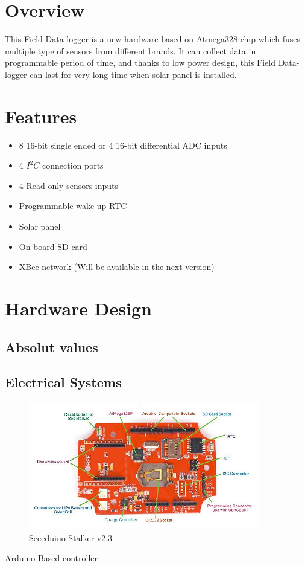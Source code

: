 \newpage
\tableofcontents \newpage
\listoffigures  \newpage

\newpage

\section{Overview}
    This Field Data-logger is a new hardware based on Atmega328 chip which fuses multiple type of sensors from different brands. It can collect data in programmable period of time, and thanks to low power design, this Field Data-logger can last for very long time when solar panel is installed.

\section{Features}
    \begin{itemize}
    \item 8 16-bit single ended or 4 16-bit differential ADC inputs
    \item 4 $I^{2}C$ connection ports
    \item 4 Read only sensors inputs
    \item Programmable wake up RTC
    \item Solar panel
    \item On-board SD card
    \item XBee network (Will be available in the next version)
    \end{itemize}


\newpage
\section{Hardware Design}
  \subsection{Absolut values}
    \subsection{Electrical Systems}
            \begin{figure}[ht]
            \centering
            \includegraphics[width=0.9\textwidth]{Stalker.jpg}
            \caption{\label{fig:Seeeduino Stalker}Seeeduino Stalker v2.3}
            \end{figure}
    Arduino Based controller 
